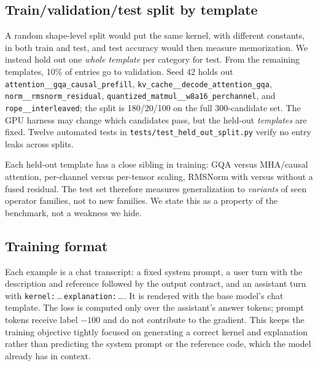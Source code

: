 \documentclass[11pt]{article}
\newcommand{\code}[1]{\texttt{#1}}
\begin{document}
\subsection{Train/validation/test split by template}
A random shape-level split would put the same kernel, with different constants, in both train and
test, and test accuracy would then measure memorization. We instead hold out one \emph{whole
template} per category for test. From the remaining templates, 10\% of entries go to validation.
Seed 42 holds out \code{attention\_\_gqa\_causal\_prefill}, \code{kv\_cache\_\_decode\_attention\_gqa},
\code{norm\_\_rmsnorm\_residual}, \code{quantized\_matmul\_\_w8a16\_perchannel}, and
\code{rope\_\_interleaved}; the split is 180/20/100 on the full 300-candidate set.
The GPU harness may change which candidates pass, but the held-out \emph{templates} are fixed.
Twelve automated tests in \code{tests/test\_held\_out\_split.py} verify no entry leaks across splits.

Each held-out template has a close sibling in training: GQA versus MHA/causal attention,
per-channel versus per-tensor scaling, RMSNorm with versus without a fused residual. The test set
therefore measures generalization to \emph{variants} of seen operator families, not to new
families. We state this as a property of the benchmark, not a weakness we hide.

\subsection{Training format}
Each example is a chat transcript: a fixed system prompt, a user turn with the description and
reference followed by the output contract, and an assistant turn with
\code{kernel:}\,\dots\,\code{explanation:}\,\dots. It is rendered with the base model's chat template.
The loss is computed only over the assistant's answer tokens; prompt tokens receive label $-100$
and do not contribute to the gradient.
This keeps the training objective tightly focused on generating a correct kernel and explanation
rather than predicting the system prompt or the reference code, which the model already has in
context.
\end{document}
